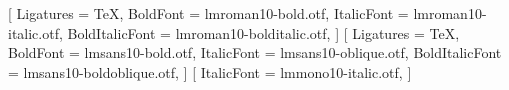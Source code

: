 
\usepackage{fontspec}
\usepackage{unicode-math}

\setmainfont{lmroman10-regular.otf}[
    Ligatures = TeX,
    BoldFont = lmroman10-bold.otf,
    ItalicFont = lmroman10-italic.otf,
    BoldItalicFont = lmroman10-bolditalic.otf,
]
\setsansfont{lmsans10-regular.otf}[
    Ligatures = TeX,
    BoldFont = lmsans10-bold.otf,
    ItalicFont = lmsans10-oblique.otf,
    BoldItalicFont = lmsans10-boldoblique.otf,
]
\setmonofont{lmmono10-regular.otf}[
    ItalicFont = lmmono10-italic.otf,
]

\usepackage{newunicodechar}
